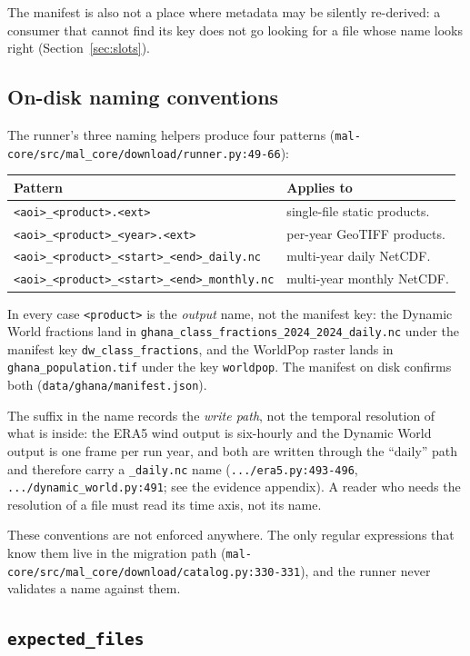 \documentclass[11pt,a4paper]{article}
\newcommand{\code}[1]{\texttt{#1}}
\begin{document}
The manifest is also not a place where metadata may be silently re-derived:
a consumer that cannot find its key does not go looking for a file whose name
looks right (Section~\ref{sec:slots}).

\subsection{On-disk naming conventions}

The runner's three naming helpers produce four patterns
(\code{mal-core/src/mal\_core/download/runner.py:49-66}):

\begin{longtable}{@{}lp{}@{}}
\toprule
Pattern & Applies to \\
\midrule
\endhead
\code{<aoi>\_<product>.<ext>} & single-file static products. \\
\code{<aoi>\_<product>\_<year>.<ext>} & per-year GeoTIFF products. \\
\code{<aoi>\_<product>\_<start>\_<end>\_daily.nc} & multi-year daily NetCDF. \\
\code{<aoi>\_<product>\_<start>\_<end>\_monthly.nc} & multi-year monthly NetCDF. \\
\bottomrule
\end{longtable}

In every case \code{<product>} is the \emph{output} name, not the manifest
key: the Dynamic World fractions land in
\code{ghana\_class\_fractions\_2024\_2024\_daily.nc} under the manifest key
\code{dw\_class\_fractions}, and the WorldPop raster lands in
\code{ghana\_population.tif} under the key \code{worldpop}. The manifest on
disk confirms both (\code{data/ghana/manifest.json}).

The suffix in the name records the \emph{write path}, not the temporal
resolution of what is inside: the ERA5 wind output is six-hourly and the
Dynamic World output is one frame per run year, and both are written through
the ``daily'' path and therefore carry a \code{\_daily.nc} name
(\code{.../era5.py:493-496}, \code{.../dynamic\_world.py:491}; see the
evidence appendix). A reader who needs the resolution of a file must read
its time axis, not its name.

These conventions are not enforced anywhere. The only regular expressions
that know them live in the migration path
(\code{mal-core/src/mal\_core/download/catalog.py:330-331}), and the runner
never validates a name against them.

\subsection{\code{expected\_files}}
\end{document}

